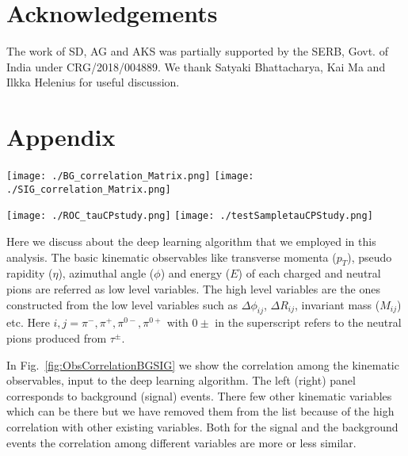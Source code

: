 \documentclass[pdftex,twocolumn,epjc3]{svjour3}          %
\begin{document}
\section*{Acknowledgements}
The work of SD, AG and AKS was partially supported by the SERB, Govt. of India under  CRG/2018/004889. We thank Satyaki Bhattacharya, Kai Ma and Ilkka Helenius for useful discussion.

\section*{Appendix}
%
\begin{figure*}[t]
\centering
\texttt{[image: ./BG\_correlation\_Matrix.png]}
\texttt{[image: ./SIG\_correlation\_Matrix.png]}
\caption{  {\small Correlation among the kinematic observables (both low level as well as high level), which are used as input to the deep learning algorithm is displayed here. The left and right panel corresponds to the background and signal events, respectively.}}
	\label{fig:ObsCorrelationBGSIG}
\end{figure*}
%
%
\begin{figure*}[t]
\centering
\texttt{[image: ./ROC\_tauCPstudy.png]}
\texttt{[image: ./testSampletauCPStudy.png]}
\caption{  {\small Left panel: the ROC curve. Right panel: the DNN output which is used to discriminate the signal and background events.}}
	\label{fig:ROCandDeepOutputpartonlevel}
\end{figure*}
%
%
Here we discuss about the deep learning algorithm that we employed in this analysis. The basic kinematic observables like transverse momenta ($p_T$), pseudo rapidity ($\eta$), azimuthal angle ($\phi$) and energy ($E$) of each charged and neutral pions are referred as low level variables. The high level variables are the ones constructed from the low level variables such as $\Delta \phi_{ij}$, $\Delta R_{ij}$, invariant mass ($M_{ij}$) etc. Here $i,j = \pi^-, \pi^+,\pi^{0-}, \pi^{0+}$ with $0\pm$ in the superscript refers to the neutral pions produced from $\tau^{\pm}$.

In Fig.~\ref{fig:ObsCorrelationBGSIG} we show the correlation among the kinematic observables, input to the deep learning algorithm. The left (right) panel corresponds to background (signal) events. There few other kinematic variables which can be there but we have removed them from the list because of the high correlation with other existing variables. Both for the signal and the background events the correlation among different variables are more or less similar. 
\end{document}
